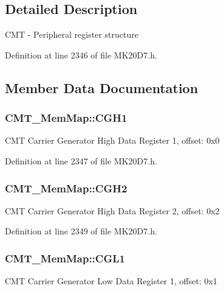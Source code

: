 \subsection{Detailed Description}
C\+MT -\/ Peripheral register structure 

Definition at line 2346 of file M\+K20\+D7.\+h.



\subsection{Member Data Documentation}
\subsubsection[{\texorpdfstring{C\+G\+H1}{CGH1}}]{ C\+M\+T\+\_\+\+Mem\+Map\+::\+C\+G\+H1}\hypertarget{struct_c_m_t___mem_map_a5efaf7b63ca9b1c492c633304e306dfa}{}\label{struct_c_m_t___mem_map_a5efaf7b63ca9b1c492c633304e306dfa}
C\+MT Carrier Generator High Data Register 1, offset\+: 0x0 

Definition at line 2347 of file M\+K20\+D7.\+h.

\subsubsection[{\texorpdfstring{C\+G\+H2}{CGH2}}]{ C\+M\+T\+\_\+\+Mem\+Map\+::\+C\+G\+H2}\hypertarget{struct_c_m_t___mem_map_ae61900f68e5537b44f02af4f79a902e4}{}\label{struct_c_m_t___mem_map_ae61900f68e5537b44f02af4f79a902e4}
C\+MT Carrier Generator High Data Register 2, offset\+: 0x2 

Definition at line 2349 of file M\+K20\+D7.\+h.

\subsubsection[{\texorpdfstring{C\+G\+L1}{CGL1}}]{ C\+M\+T\+\_\+\+Mem\+Map\+::\+C\+G\+L1}\hypertarget{struct_c_m_t___mem_map_a3251aaf1799b7c991993412230df664b}{}\label{struct_c_m_t___mem_map_a3251aaf1799b7c991993412230df664b}
C\+MT Carrier Generator Low Data Register 1, offset\+: 0x1 

